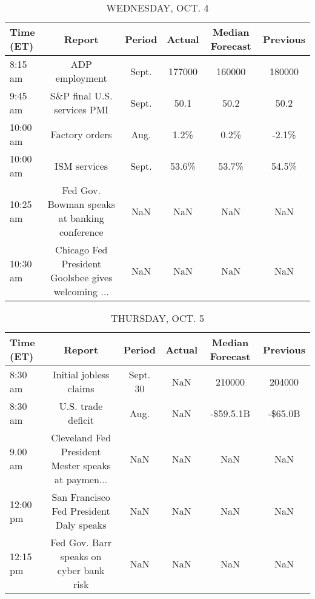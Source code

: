 \documentclass{article}%
\begin{document}
%


\begin{table}[htbp]%
\caption{WEDNESDAY, OCT. 4}%
\centering%
\begin{adjustbox}{width=1\textwidth}%
\begin{tabular}{lccccc}
\toprule
Time (ET) &                                             Report & Period & Actual & Median Forecast & Previous \\
\midrule
  8:15 am &                                     ADP employment &  Sept. & 177000 &          160000 &   180000 \\
  9:45 am &                        S\&P final U.S. services PMI &  Sept. &   50.1 &            50.2 &     50.2 \\
 10:00 am &                                     Factory orders &   Aug. &   1.2\% &            0.2\% &    -2.1\% \\
 10:00 am &                                       ISM services &  Sept. &  53.6\% &           53.7\% &    54.5\% \\
 10:25 am &       Fed Gov. Bowman speaks at banking conference &    NaN &    NaN &             NaN &      NaN \\
 10:30 am & Chicago Fed President Goolsbee gives welcoming ... &    NaN &    NaN &             NaN &      NaN \\
\bottomrule
\end{tabular}
%
\end{adjustbox}%
\end{table}

%


\begin{table}[htbp]%
\caption{THURSDAY, OCT. 5}%
\centering%
\begin{adjustbox}{width=1\textwidth}%
\begin{tabular}{lccccc}
\toprule
Time (ET) &                                             Report &   Period & Actual & Median Forecast & Previous \\
\midrule
  8:30 am &                             Initial jobless claims & Sept. 30 &    NaN &          210000 &   204000 \\
  8:30 am &                                 U.S. trade deficit &     Aug. &    NaN &       -\$59.5.1B &  -\$65.0B \\
  9.00 am & Cleveland Fed President Mester speaks at paymen... &      NaN &    NaN &             NaN &      NaN \\
 12:00 pm &            San Francisco Fed President Daly speaks &      NaN &    NaN &             NaN &      NaN \\
 12:15 pm &            Fed Gov. Barr speaks on cyber bank risk &      NaN &    NaN &             NaN &      NaN \\
\bottomrule
\end{tabular}
%
\end{adjustbox}%
\end{table}
\end{document}
